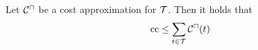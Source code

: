 \begin{theorem}
  Let ${\mathcal{C}^\sqcap}$ be a cost approximation for $\mathcal{T}$.
  Then it holds that 
  \[ \text{cc} \leq \sum_{t \in \mathcal{T}} {\mathcal{C}^\sqcap}(t) \]
\end{theorem}
